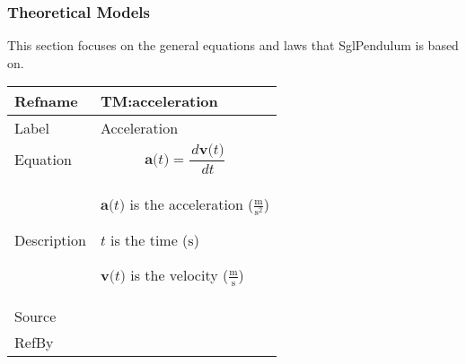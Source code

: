 \documentclass[12pt]{article}
\begin{document}
\subsubsection{Theoretical Models}
\label{Sec:TMs}
This section focuses on the general equations and laws that SglPendulum is based on.

\vspace{\baselineskip}
\noindent
\begin{minipage}{\textwidth}
\begin{tabular}{>{\raggedright}p{}>{\raggedright\arraybackslash}p{}}
\toprule \textbf{Refname} & \textbf{TM:acceleration}
\label{TM:acceleration}
\\ \midrule
Label & Acceleration
        
\\ \midrule
Equation & \begin{displaymath}
           \symbf{a}\text{(}t\text{)}=\frac{\,d\symbf{v}\text{(}t\text{)}}{\,dt}
           \end{displaymath}
\\ \midrule
Description & \begin{symbDescription}
              \item{$\symbf{a}\text{(}t\text{)}$ is the acceleration ($\frac{\text{m}}{\text{s}^{2}}$)}
              \item{$t$ is the time (${\text{s}}$)}
              \item{$\symbf{v}\text{(}t\text{)}$ is the velocity ($\frac{\text{m}}{\text{s}}$)}
              \end{symbDescription}
\\ \midrule
Source & \cite{accelerationWiki}
         
\\ \midrule
RefBy & 
\\ \bottomrule
\end{tabular}
\end{minipage}
\vspace{\baselineskip}
\noindent
\end{document}
